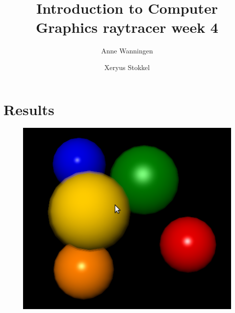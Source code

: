 \documentclass{beamer}
\author{Anne Wanningen \and Xeryus Stokkel}
\title[Week 4]{Introduction to Computer Graphics raytracer week 4}
\begin{document}
\maketitle

\section{Results}
\begin{frame}
	\begin{figure}
		\includegraphics[width=\textwidth]{result.png}
	\end{figure}
\end{frame}
\end{document}
